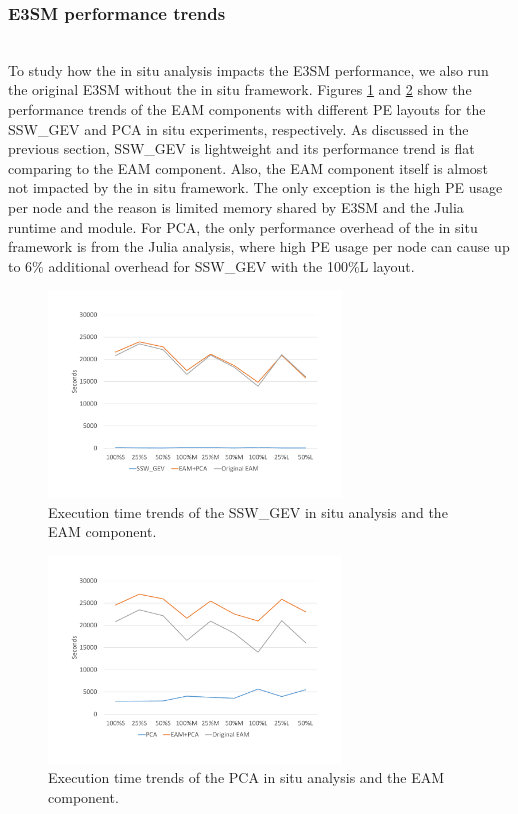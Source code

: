 \documentclass{juliacon}
\begin{document}
\subsubsection{E3SM performance trends}\hspace*{\fill} \\

To study how the in situ analysis impacts the E3SM performance, we also run the original E3SM without the in situ framework. Figures \ref{fig:ssw_trend} and \ref{fig:pca_trend} show the performance trends of the EAM components with different PE layouts for the SSW\_GEV and PCA in situ experiments, respectively. As discussed in the previous section, SSW\_GEV is lightweight and its performance trend is flat comparing to the EAM component. Also, the EAM component itself is almost not impacted by the in situ framework. The only exception is the high PE usage per node and the reason is limited memory shared by E3SM and the Julia runtime and module. For PCA, the only performance overhead of the in situ framework is from the Julia analysis, where high PE usage per node can cause up to 6\% additional overhead for SSW\_GEV with the 100\%L layout. 


\begin{figure}
    \centering
    \includegraphics[width=\linewidth, height=5.5cm]{figures/ssw_trend.pdf}
    \caption{Execution time trends of the SSW\_GEV in situ analysis and the EAM component.}
    \label{fig:ssw_trend}
\end{figure}


\begin{figure}
    \centering
    \includegraphics[width=\linewidth, height=5.5cm]{figures/pca_trend.pdf}
    \caption{Execution time trends of the PCA in situ analysis and the EAM component.}
    \label{fig:pca_trend}
\end{figure}
\end{document}
